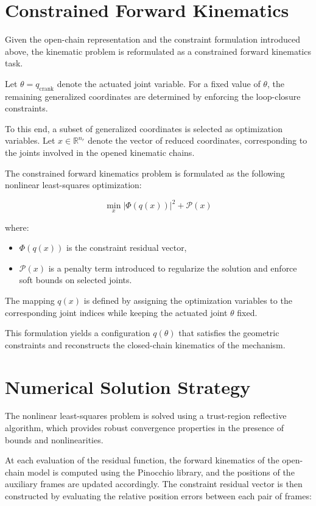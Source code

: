 \section{Constrained Forward Kinematics}
Given the open-chain representation and the constraint formulation introduced above, the kinematic problem is reformulated as a constrained forward kinematics task.

Let $\theta = q_{\text{crank}}$ denote the actuated joint variable. For a fixed value of $\theta$, the remaining generalized coordinates are determined by enforcing the loop-closure constraints.

To this end, a subset of generalized coordinates is selected as optimization variables. Let  $x \in \mathbb{R}^{n_r}$ denote the vector of reduced coordinates, corresponding to the joints involved in the opened kinematic chains.

The constrained forward kinematics problem is formulated as the following nonlinear least-squares optimization:

\begin{equation}
    \min_{x}  |\Phi(q(x))|^2 + \mathcal{P}(x)
\end{equation}


where:
\begin{itemize}
    \item $\Phi(q(x))$ is the constraint residual vector,
    \item $\mathcal{P}(x)$ is a penalty term introduced to regularize the solution and enforce soft bounds on selected joints.
\end{itemize}

The mapping $q(x)$ is defined by assigning the optimization variables to the corresponding joint indices while keeping the actuated joint $\theta$ fixed.

This formulation yields a configuration $q(\theta)$ that satisfies the geometric constraints and reconstructs the closed-chain kinematics of the mechanism.




\section{Numerical Solution Strategy}

The nonlinear least-squares problem is solved using a trust-region reflective algorithm, which provides robust convergence properties in the presence of bounds and nonlinearities.

At each evaluation of the residual function, the forward kinematics of the open-chain model is computed using the Pinocchio library, and the positions of the auxiliary frames are updated accordingly. The constraint residual vector is then constructed by evaluating the relative position errors between each pair of frames:

